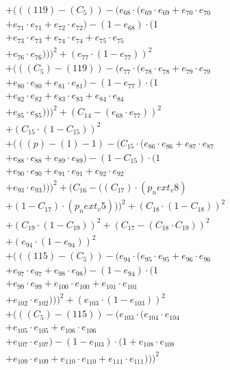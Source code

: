\documentclass[10pt, a4paper]{article}
\begin{document}
\begin{align*}
& + (((119) - (C_{5})) - (e_{68} \cdot (e_{69} \cdot e_{69} + e_{70} \cdot e_{70} \\
& + e_{71} \cdot e_{71} + e_{72} \cdot e_{72}) - (1 - e_{68}) \cdot (1 \\
& + e_{73} \cdot e_{73} + e_{74} \cdot e_{74} + e_{75} \cdot e_{75} \\
& + e_{76} \cdot e_{76})))^{2} + (e_{77} \cdot (1 - e_{77}))^{2} \\
& + (((C_{5}) - (119)) - (e_{77} \cdot (e_{78} \cdot e_{78} + e_{79} \cdot e_{79} \\
& + e_{80} \cdot e_{80} + e_{81} \cdot e_{81}) - (1 - e_{77}) \cdot (1 \\
& + e_{82} \cdot e_{82} + e_{83} \cdot e_{83} + e_{84} \cdot e_{84} \\
& + e_{85} \cdot e_{85})))^{2} + (C_{14} - (e_{68} \cdot e_{77}))^{2} \\
& + (C_{15} \cdot (1 - C_{15}))^{2} \\
& + (((p) - (1) - 1) - (C_{15} \cdot (e_{86} \cdot e_{86} + e_{87} \cdot e_{87} \\
& + e_{88} \cdot e_{88} + e_{89} \cdot e_{89}) - (1 - C_{15}) \cdot (1 \\
& + e_{90} \cdot e_{90} + e_{91} \cdot e_{91} + e_{92} \cdot e_{92} \\
& + e_{93} \cdot e_{93})))^{2} + (C_{16} - ((C_{17})  \cdot  (p_next_v8) \\
& + (1 - C_{17})  \cdot  (p_next_v5)))^{2} + (C_{18} \cdot (1 - C_{18}))^{2} \\
& + (C_{19} \cdot (1 - C_{19}))^{2} + (C_{17} - (C_{18} \cdot C_{19}))^{2} \\
& + (e_{94} \cdot (1 - e_{94}))^{2} \\
& + (((115) - (C_{5})) - (e_{94} \cdot (e_{95} \cdot e_{95} + e_{96} \cdot e_{96} \\
& + e_{97} \cdot e_{97} + e_{98} \cdot e_{98}) - (1 - e_{94}) \cdot (1 \\
& + e_{99} \cdot e_{99} + e_{100} \cdot e_{100} + e_{101} \cdot e_{101} \\
& + e_{102} \cdot e_{102})))^{2} + (e_{103} \cdot (1 - e_{103}))^{2} \\
& + (((C_{5}) - (115)) - (e_{103} \cdot (e_{104} \cdot e_{104} \\
& + e_{105} \cdot e_{105} + e_{106} \cdot e_{106} \\
& + e_{107} \cdot e_{107}) - (1 - e_{103}) \cdot (1 + e_{108} \cdot e_{108} \\
& + e_{109} \cdot e_{109} + e_{110} \cdot e_{110} + e_{111} \cdot e_{111})))^{2} \\

\end{align*}
\end{document}
